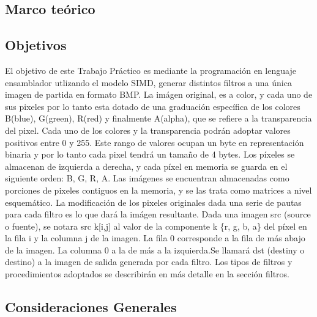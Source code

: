 \subsection{Marco teórico}


\subsection{Objetivos}

El objetivo de este Trabajo Práctico es mediante la programaci\'on en lenguaje ensamblador utlizando el modelo SIMD, generar distintos filtros a una \'unica imagen de partida en formato BMP. 
 La im\'agen original, es a color, y cada uno de sus pixeles por lo tanto esta dotado de una graduaci\'on espec\'ifica de los colores B(blue), G(green), R(red) y finalmente A(alpha), que se refiere a la transparencia del pixel. Cada uno de los colores y la transparencia podr\'an adoptar valores positivos entre 0 y 255. Este rango de valores ocupan un byte en representaci\'on binaria y por lo tanto cada pixel tendr\'a un tama\~no de 4 bytes.
Los p\'ixeles se almacenan de izquierda a derecha, y cada p\'ixel en memoria se guarda en el siguiente orden: B, G, R, A.
 Las im\'agenes se encuentran almacenadas como porciones de pixeles contiguos en la memoria, y se las trata como matrices a nivel esquem\'atico. La modificaci\'on de los pixeles originales dada una serie de pautas para cada filtro es lo que dar\'a la im\'agen resultante. 
 Dada una imagen src (source o fuente), se notara src k[i,j] al valor de la componente k  \{r, g, b, a\} del píxel en la fila i y la columna j de la imagen. La fila 0 corresponde a la fila de más abajo de la imagen. La columna 0 a la de más a la izquierda.Se llamar\'a dst (destiny o destino) a la imagen de salida generada por cada filtro.
 Los tipos de filtros y procedimientos adoptados se describir\'an en m\'as detalle en la secci\'on filtros.

\subsection{Consideraciones Generales}




